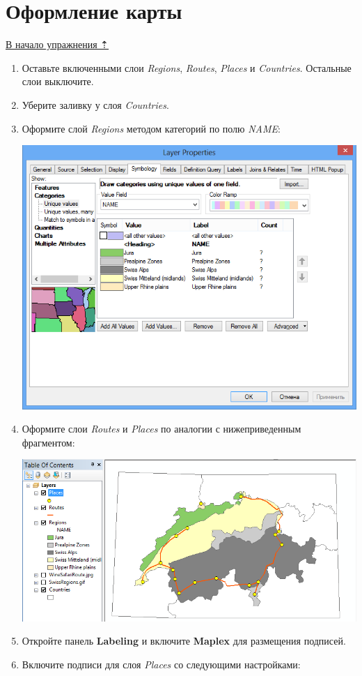 \documentclass[]{book}
\theoremstyle{definition}
\theoremstyle{definition}
\theoremstyle{definition}
\theoremstyle{remark}
\begin{document}
\hypertarget{map-ref-general-design}{%
\section{Оформление карты}\label{map-ref-general-design}}

\protect\hyperlink{map-ref-general}{В начало упражнения ⇡}

\begin{enumerate}
\def\labelenumi{\arabic{enumi}.}
\item
  Оставьте включенными слои \emph{Regions}, \emph{Routes}, \emph{Places}
  и \emph{Countries}. Остальные слои выключите.
\item
  Уберите заливку у слоя \emph{Countries}.
\item
  Оформите слой \emph{Regions} методом категорий по полю \emph{NAME}:

  \includegraphics{images/Ex05/image30.png}
\item
  Оформите слои \emph{Routes} и \emph{Places} по аналогии с
  нижеприведенным фрагментом:

  \includegraphics{images/Ex05/image31.png}
\item
  Откройте панель \textbf{Labeling} и включите \textbf{Maplex} для
  размещения подписей.
\item
  Включите подписи для слоя \emph{Places} со следующими настройками:


\end{enumerate}
\end{document}
